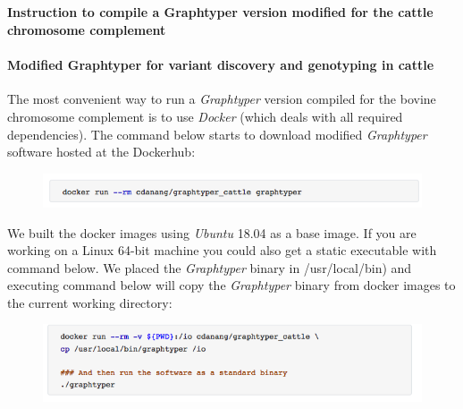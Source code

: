 \documentclass[../main.tex]{subfiles}
\begin{document}
\fi



\newpage
\renewcommand \thesubsection {Additional file 2.\arabic{subsection}}


\begin{flushleft}


\subsection{}
\label{supp_mat:21}
\textbf{\large{Instruction to compile a Graphtyper version modified for the cattle chromosome complement}}


\paragraph*{Modified Graphtyper for variant discovery and genotyping in cattle}

The most convenient way to run a \emph{Graphtyper} version compiled for the bovine chromosome complement is to use \emph{Docker} (which deals with all required dependencies). The command below starts to download modified \emph{Graphtyper} software hosted at the Dockerhub:

\begin{figure}[h]
    \centering
    \includegraphics[width=\textwidth]{paper1/supplement/sp11.png}
\end{figure}

We built the docker images using \emph{Ubuntu} 18.04 as a base image. If you are working on a Linux
64-bit machine you could also get a static executable with command below. We placed the
\emph{Graphtyper} binary in /usr/local/bin) and executing command below will copy the \emph{Graphtyper}
binary from docker images to the current working directory:

\begin{figure}[h]
    \centering
    \includegraphics[width=\textwidth]{paper1/supplement/sp12.png}
\end{figure}


\end{flushleft}
\end{document}
